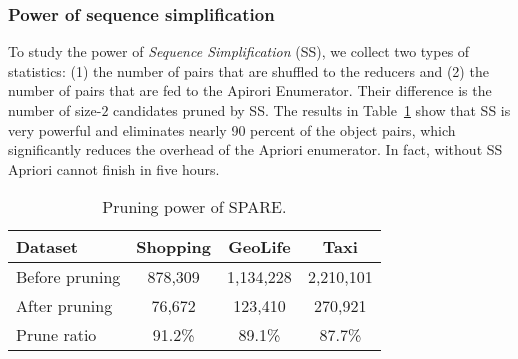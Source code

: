 \subsubsection{Power of sequence simplification}
To study the power of \emph{Sequence Simplification} (SS),
we collect two types of statistics: (1) the number of pairs that
are shuffled to the reducers and (2) the number of pairs that
are fed to the Apirori Enumerator. 
Their difference %
is the number of size-$2$ candidates pruned by SS.
The results in Table~\ref{tbl:pruning} show that %
SS is very powerful and eliminates nearly 90 percent of the object pairs, 
which significantly reduces the overhead of %
the Apriori enumerator.
In fact, without SS Apriori cannot
finish in five hours.



\begin{table}[h]
\centering
\begin{tabular}{|l|c|c|c|}
\hline 
\textbf{Dataset} & \textbf{Shopping} & \textbf{GeoLife} & \textbf{Taxi} \\ 
\hline 
Before pruning & 878,309 &  1,134,228 & 2,210,101 \\ 
\hline 
After pruning & 76,672 & 123,410 & 270,921 \\ 
\hline 
Prune ratio & 91.2\% & 89.1\% & 87.7\% \\ 
\hline 
\end{tabular} 
\caption{Pruning power of SPARE.}
\label{tbl:pruning}
\end{table}

